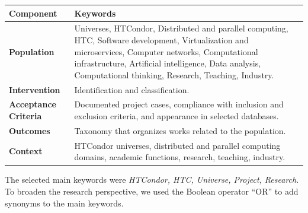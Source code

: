 \begin{table}
	{\begin{tabular}{p{3.5cm}p{6.0cm}} \toprule
			\textbf{Component}           & \textbf{Keywords}                                                                                                                                                                                                                                                    \\
			\midrule
			\textbf{Population}          & Universes, HTCondor, Distributed and parallel computing, HTC, Software development, Virtualization and microservices, Computer networks, Computational infrastructure, Artificial intelligence, Data analysis, Computational thinking, Research, Teaching, Industry. \\
			\textbf{Intervention}        & Identification and classification.                                                                                                                                                                                                                                   \\
			\textbf{Acceptance Criteria} & Documented project cases, compliance with inclusion and exclusion criteria, and appearance in selected databases.                                                                                                                                                    \\
			\textbf{Outcomes}            & Taxonomy that organizes works related to the population.                                                                                                                                                                                                             \\
			\textbf{Context}             & HTCondor universes, distributed and parallel computing domains, academic functions, research, teaching, industry.                                                                                                                                                    \\
			\bottomrule
		\end{tabular}}
	\label{table:picoc_keywords}
\end{table}


The selected main keywords were \textit{HTCondor, HTC, Universe, Project, Research}. To broaden the research perspective, we used the Boolean operator ``OR'' to add synonyms to the main keywords.

